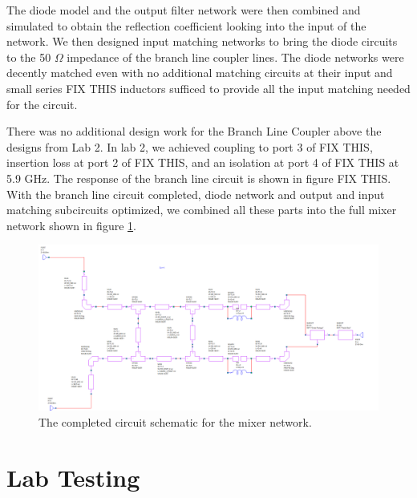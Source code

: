 \documentclass[twocolumn, aps, floatfix]{revtex4-1}
\begin{document}
The diode model and the output filter network were then combined and simulated to obtain the reflection coefficient looking into the input of the network. We then designed input matching networks to bring the diode circuits to the 50 $\Omega$ impedance of the branch line coupler lines. The diode networks were decently matched even with no additional matching circuits at their input and small series FIX THIS inductors sufficed to provide all the input matching needed for the circuit.

There was no additional design work for the Branch Line Coupler above the designs from Lab 2. In lab 2, we achieved coupling to port 3 of FIX THIS, insertion loss at port 2 of FIX THIS, and an isolation at port 4 of FIX THIS at 5.9 GHz. The response of the branch line circuit is shown in figure FIX THIS. With the branch line circuit completed, diode network and output and input matching subcircuits optimized, we combined all these parts into the full mixer network shown in figure \ref{fig:fullcircuit}.

\begin{figure}[!htbp]
    \includegraphics[scale=0.46]{full_circuit.png}
    \caption{The completed circuit schematic for the mixer network.}
    \label{fig:fullcircuit}
\end{figure}



\section*{Lab Testing}
\end{document}
